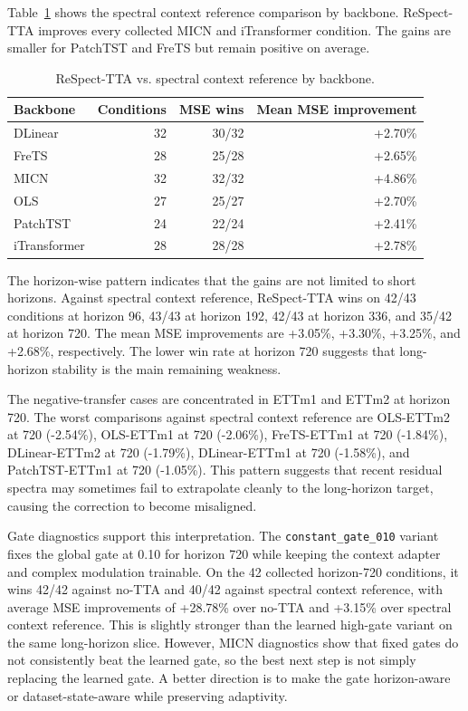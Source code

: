 \documentclass[10pt]{article}
\begin{document}
Table~\ref{tab:backbone} shows the spectral context reference comparison by backbone. ReSpect-TTA improves every collected MICN and iTransformer condition. The gains are smaller for PatchTST and FreTS but remain positive on average.

\begin{table}[h]
\centering
\small
\caption{ReSpect-TTA vs. spectral context reference by backbone.}
\label{tab:backbone}
\begin{tabular}{lrrr}
\toprule
Backbone & Conditions & MSE wins & Mean MSE improvement \\
\midrule
DLinear & 32 & 30/32 & +2.70\% \\
FreTS & 28 & 25/28 & +2.65\% \\
MICN & 32 & 32/32 & +4.86\% \\
OLS & 27 & 25/27 & +2.70\% \\
PatchTST & 24 & 22/24 & +2.41\% \\
iTransformer & 28 & 28/28 & +2.78\% \\
\bottomrule
\end{tabular}
\end{table}

The horizon-wise pattern indicates that the gains are not limited to short horizons. Against spectral context reference, ReSpect-TTA wins on 42/43 conditions at horizon 96, 43/43 at horizon 192, 42/43 at horizon 336, and 35/42 at horizon 720. The mean MSE improvements are +3.05\%, +3.30\%, +3.25\%, and +2.68\%, respectively. The lower win rate at horizon 720 suggests that long-horizon stability is the main remaining weakness.

The negative-transfer cases are concentrated in ETTm1 and ETTm2 at horizon 720. The worst comparisons against spectral context reference are OLS-ETTm2 at 720 (-2.54\%), OLS-ETTm1 at 720 (-2.06\%), FreTS-ETTm1 at 720 (-1.84\%), DLinear-ETTm2 at 720 (-1.79\%), DLinear-ETTm1 at 720 (-1.58\%), and PatchTST-ETTm1 at 720 (-1.05\%). This pattern suggests that recent residual spectra may sometimes fail to extrapolate cleanly to the long-horizon target, causing the correction to become misaligned.

Gate diagnostics support this interpretation. The \texttt{constant\_gate\_010} variant fixes the global gate at 0.10 for horizon 720 while keeping the context adapter and complex modulation trainable. On the 42 collected horizon-720 conditions, it wins 42/42 against no-TTA and 40/42 against spectral context reference, with average MSE improvements of +28.78\% over no-TTA and +3.15\% over spectral context reference. This is slightly stronger than the learned high-gate variant on the same long-horizon slice. However, MICN diagnostics show that fixed gates do not consistently beat the learned gate, so the best next step is not simply replacing the learned gate. A better direction is to make the gate horizon-aware or dataset-state-aware while preserving adaptivity.
\end{document}
